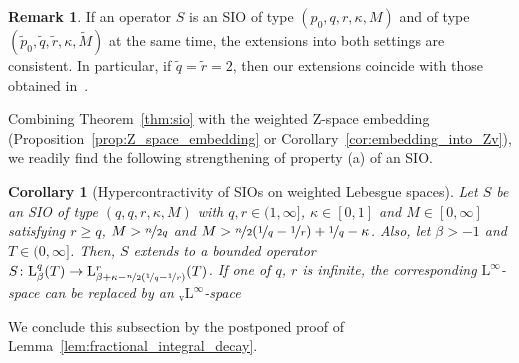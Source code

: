 \documentclass[11pt, leqno]{amsart}
\newtheorem{corollary}[theorem]{Corollary}
\theoremstyle{definition}
\newtheorem{remark}[theorem]{Remark}
\renewcommand{\L}{\mathrm{L}}
\newcommand{\Z}{\mathrm{Z}}
\newcommand{\Lv}{{}_\mathrm{v}\mathrm{L}}
\begin{document}
	\begin{remark}
		\label{rem:SIO_thm}
		If an operator $S$ is an SIO of type $(p_0,q,r,\kappa,M)$ and of type $(\tilde p_0,\tilde q,\tilde r,\kappa,\tilde M)$ at the same time, the extensions into both settings are consistent. In particular, if $\tilde q = \tilde r = 2$, then our extensions coincide with those obtained in~\cite{AH3}.
	\end{remark}

	Combining Theorem~\ref{thm:sio} with the weighted $\Z$-space embedding (Proposition~\ref{prop:Z_space_embedding} or Corollary~\ref{cor:embedding_into_Zv}), we readily find the following strengthening of property (a) of an SIO.

	\begin{corollary}[Hypercontractivity of SIOs on weighted Lebesgue spaces]
		\label{cor:SIO_weighted_Lq}
		Let $S$ be an SIO of type $(q,q,r,\kappa,M)$ with $q,r \in (1,\infty]$, $\kappa \in [0,1]$ and $M \in [0,\infty]$ satisfying $r \geq q$, $M > \nicefrac{n}{2q}$ and $M > \nicefrac{n}{2}(\nicefrac{1}{q} - \nicefrac{1}{r}) + \nicefrac{1}{q} - \kappa$.
		Also, let $\beta > -1$ and $T \in (0,\infty]$. Then, $S$ extends to a bounded operator $S \colon \L^q_\beta(T) \to \L^r_{\beta + \kappa - \nicefrac{n}{2}(\nicefrac{1}{q} - \nicefrac{1}{r})}(T)$.
		If one of $q$, $r$ is infinite, the corresponding $\L^\infty$-space can be replaced by an $\Lv^\infty$-space
	\end{corollary}





	We conclude this subsection by the postponed proof of Lemma~\ref{lem:fractional_integral_decay}.
\end{document}
